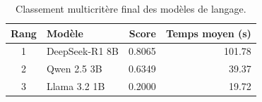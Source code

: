 \begin{table}[!htbp]
\centering
\caption{Classement multicritère final des modèles de langage.}
\label{tab:llm_final_ranking}
\begin{tabular}{clrr}
\toprule
\textbf{Rang} & \textbf{Modèle} & \textbf{Score} & \textbf{Temps moyen (s)} \\
\midrule
1 & DeepSeek-R1 8B & 0.8065 & 101.78 \\
2 & Qwen 2.5 3B & 0.6349 & 39.37 \\
3 & Llama 3.2 1B & 0.2000 & 19.72 \\
\bottomrule
\end{tabular}
\end{table}

